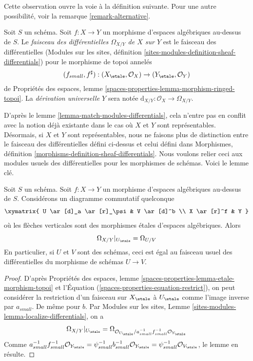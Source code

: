 \noindent
Cette observation ouvre la voie à la définition suivante. Pour une autre possibilité, voir
la remarque \ref{remark-alternative}.

\begin{definition}
\label{definition-sheaf-differentials}
Soit $S$ un schéma. Soit $f : X \to Y$ un morphisme d'espaces algébriques
au-dessus de $S$. Le {\it faisceau des différentielles $\Omega_{X/Y}$ de $X$ sur $Y$}
est le faisceau des différentielles
(Modules sur les sites,
définition \ref{sites-modules-definition-sheaf-differentials})
pour le morphisme de topoi annelés
$$
(f_{small}, f^\sharp) :
(X_\etale, \mathcal{O}_X)
\to
(Y_\etale, \mathcal{O}_Y)
$$
de
Propriétés des espaces,
lemme \ref{spaces-properties-lemma-morphism-ringed-topoi}.
La {\it dérivation universelle $Y$} sera notée
$\text{d}_{X/Y} : \mathcal{O}_X \to \Omega_{X/Y}$.
\end{definition}

\noindent
D'après
le lemme \ref{lemma-match-modules-differentials},
cela n'entre pas en conflit avec la notion déjà existante
dans le cas où $X$ et $Y$ sont représentables. Désormais, si $X$ et $Y$
sont représentables, nous ne faisons plus de distinction entre le faisceau des différentielles
défini ci-dessus et celui défini dans
Morphismes, définition \ref{morphisms-definition-sheaf-differentials}.
Nous voulons relier ceci aux modules usuels des différentielles pour les
morphismes de schémas. Voici le lemme clé.

\begin{lemma}
\label{lemma-localize-differentials}
Soit $S$ un schéma. Soit $f : X \to Y$ un morphisme d'espaces algébriques
au-dessus de $S$. Considérons un diagramme commutatif quelconque
$$
\xymatrix{
U \ar[d]_a \ar[r]_\psi & V \ar[d]^b \\
X \ar[r]^f & Y
}
$$
où les flèches verticales sont des morphismes \'etales d'espaces algébriques. Alors
$$
\Omega_{X/Y}|_{U_\etale} = \Omega_{U/V}
$$
En particulier, si $U$ et $V$ sont des schémas, ceci est égal au
faisceau usuel des différentielles du morphisme de schémas $U \to V$.
\end{lemma}

\begin{proof}
D'après
Propriétés des espaces, lemme \ref{spaces-properties-lemma-etale-morphism-topoi}
et l'Équation (\ref{spaces-properties-equation-restrict}),
on peut considérer la restriction d'un faisceau sur $X_\etale$ à
$U_\etale$ comme l'image inverse par $a_{small}$. De même pour $b$. Par
Modules sur les sites, Lemme \ref{sites-modules-lemma-localize-differentials},
on a
$$
\Omega_{X/Y}|_{U_\etale} =
\Omega_{\mathcal{O}_{U_\etale}/
a_{small}^{-1}f_{small}^{-1}\mathcal{O}_{Y_\etale}}
$$
Comme $a_{small}^{-1}f_{small}^{-1}\mathcal{O}_{Y_\etale}
= \psi_{small}^{-1}b_{small}^{-1}\mathcal{O}_{Y_\etale}
= \psi_{small}^{-1}\mathcal{O}_{V_\etale}$, le lemme en résulte.
\end{proof}


